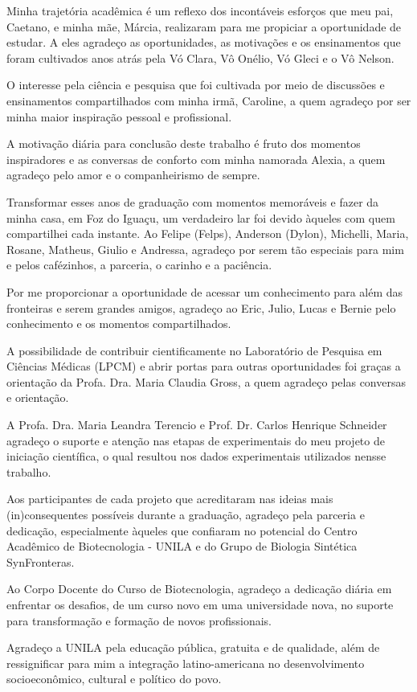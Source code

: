 
\begin{justify}

\hspace{12 mm}Minha trajetória acadêmica é um reflexo dos incontáveis esforços que meu pai, Caetano, e minha mãe, Márcia, realizaram para me propiciar a oportunidade de estudar. A eles agradeço as oportunidades, as motivações e os ensinamentos que foram cultivados anos atrás pela Vó Clara, Vô Onélio, Vó Gleci e o Vô Nelson. 

O interesse pela ciência e pesquisa  que foi cultivada por meio de discussões e ensinamentos compartilhados com minha irmã, Caroline, a quem agradeço por ser minha maior inspiração pessoal e profissional.

A motivação diária para conclusão deste trabalho é fruto dos momentos inspiradores e as conversas de conforto com minha namorada Alexia, a quem agradeço pelo amor e o companheirismo de sempre. 

Transformar esses anos de graduação com momentos memoráveis e fazer da minha casa, em Foz do Iguaçu, um verdadeiro lar foi devido àqueles com quem compartilhei cada instante. Ao Felipe (Felps), Anderson (Dylon), Michelli, Maria, Rosane, Matheus, Giulio e Andressa, agradeço por serem tão especiais para mim e pelos cafézinhos, a parceria, o carinho e a paciência.

Por me proporcionar a oportunidade de acessar um conhecimento para além das fronteiras e serem grandes amigos, agradeço ao Eric, Julio, Lucas e Bernie pelo conhecimento e os momentos compartilhados. 

A possibilidade de contribuir cientificamente no Laboratório de Pesquisa em Ciências Médicas (LPCM) e abrir portas para outras oportunidades foi graças a orientação da Profa. Dra. Maria Claudia Gross, a quem agradeço pelas conversas e orientação.

A Profa. Dra. Maria Leandra Terencio e Prof. Dr. Carlos Henrique Schneider agradeço o suporte e atenção nas etapas de experimentais do meu projeto de iniciação científica, o qual resultou nos dados experimentais utilizados nensse trabalho. 

Aos participantes de cada projeto que acreditaram nas ideias mais (in)consequentes possíveis durante a graduação, agradeço pela parceria e dedicação, especialmente àqueles que confiaram no potencial do Centro Acadêmico de Biotecnologia - UNILA e do Grupo de Biologia Sintética SynFronteras.

Ao Corpo Docente do Curso de Biotecnologia, agradeço a dedicação diária em enfrentar os desafios, de um curso novo em uma universidade nova, no suporte para transformação e formação de novos profissionais. 

Agradeço a UNILA pela educação pública, gratuita e de qualidade, além de ressignificar para mim a integração latino-americana no desenvolvimento socioeconômico, cultural e político do povo.


\end{justify}

